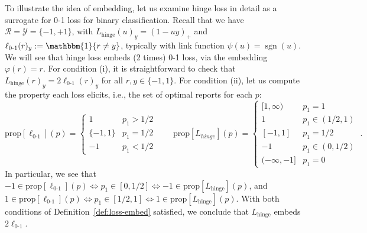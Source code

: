 \documentclass[11pt]{article}
\newcommand{\prop}[1]{\mathrm{prop}[#1]}
\newcommand{\R}{\mathcal{R}}
\newcommand{\Y}{\mathcal{Y}}
\newcommand{\ones}{\mathbbm{1}}
\newcommand{\Ind}[1]{\ones\{#1\}}
\newcommand{\hinge}{L_{\mathrm{hinge}}}
\newcommand{\ellzo}{\ell_{\text{0-1}}}
\DeclareMathOperator*{\sgn}{sgn}
\begin{document}
To illustrate the idea of embedding, let us examine hinge loss in detail as a surrogate for 0-1 loss for binary classification.
Recall that we have $\R = \Y = \{-1, +1\}$, with $\hinge(u)_y = (1 - uy)_+$ and $\ellzo(r)_y := \Ind{r\neq y}$, typically with link function $\psi(u) = \sgn(u)$.
We will see that hinge loss embeds (2 times) 0-1 loss, via the embedding $\varphi(r) = r$.
For condition (i), it is straightforward to check that $\hinge(r)_y = 2\ellzo(r)_y$ for all $r,y\in\{-1,1\}$.
For condition (ii), let us compute the property each loss elicits, i.e., the set of optimal reports for each $p$:
\[
\prop{\ellzo}(p) = \begin{cases}
1 & p_1 > 1/2 \\
\{-1,1\} & p_1 = 1/2\\
-1 & p_1 < 1/2
\end{cases}
\qquad
\prop{L_{hinge}}(p) = \begin{cases}
[1,\infty) & p_1 = 1\\
1 & p_1 \in (1/2,1) \\
[-1,1] & p_1 = 1/2\\
-1& p_1 \in (0, 1/2)\\
(-\infty, -1]& p_1 = 0
\end{cases}~.
\]
In particular, we see that $-1 \in \prop{\ellzo}(p) \iff p_1 \in [0, 1/2] \iff -1 \in \prop{\hinge}(p)$, and $1 \in \prop{\ellzo}(p) \iff p_1 \in [1/2,1] \iff 1 \in \prop{\hinge}(p)$.
With both conditions of Definition~\ref{def:loss-embed} satisfied, we conclude that $\hinge$ embeds $2\ellzo$.
\end{document}
